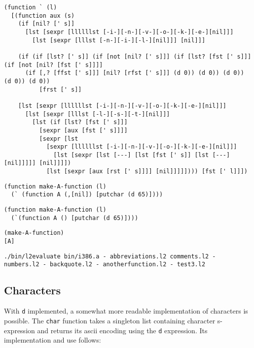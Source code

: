 \documentclass[twocolumn,landscape]{article}
\begin{document}
      \begin{lstlisting}[caption={backquote.l2}]
(function ` (l)
  [(function aux (s)
    (if [nil? [' s]]
      [lst [sexpr [llllllst [-i-][-n-][-v-][-o-][-k-][-e-][nil]]]
        [lst [sexpr [lllst [-n-][-i-][-l-][nil]]] [nil]]]

    (if (if [lst? [' s]] (if [not [nil? [' s]]] (if [lst? [fst [' s]]] (if [not [nil? [fst [' s]]]]
      (if [,? [ffst [' s]]] [nil? [rfst [' s]]] (d 0)) (d 0)) (d 0)) (d 0)) (d 0))
          [frst [' s]]

    [lst [sexpr [llllllst [-i-][-n-][-v-][-o-][-k-][-e-][nil]]]
      [lst [sexpr [lllst [-l-][-s-][-t-][nil]]]
        [lst (if [lst? [fst [' s]]]
          [sexpr [aux [fst [' s]]]]
          [sexpr [lst
            [sexpr [llllllst [-i-][-n-][-v-][-o-][-k-][-e-][nil]]]
              [lst [sexpr [lst [---] [lst [fst [' s]] [lst [---] [nil]]]]] [nil]]]])
            [lst [sexpr [aux [rst [' s]]]] [nil]]]]]))) [fst [' l]]])
      \end{lstlisting}
      
      \begin{lstlisting}[caption={anotherfunction.l2}]
(function make-A-function (l)
  (` (function A (,[nil]) [putchar (d 65)])))
      \end{lstlisting}
      
      \begin{lstlisting}[caption={or equivalently}]
(function make-A-function (l)
  (`(function A () [putchar (d 65)])))
      \end{lstlisting}
      
      \begin{lstlisting}[caption={test3.l2}]
(make-A-function)
[A]
      \end{lstlisting}
      
      \begin{lstlisting}[caption={shell}]
./bin/l2evaluate bin/i386.a - abbreviations.l2 comments.l2 - numbers.l2 - backquote.l2 - anotherfunction.l2 - test3.l2
      \end{lstlisting}

    \subsection{Characters}\label{sec:characters}
      With \lstinline{d} implemented, a somewhat more readable implementation of characters is possible. The \lstinline{char} function takes a singleton list containing character s-expression and returns its ascii encoding using the \lstinline{d} expression. Its implementation and use follows:
\end{document}
